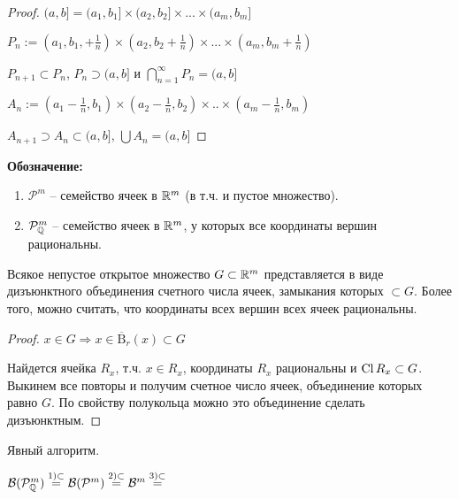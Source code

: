 \begin{proof}
    $(a, b] = (a_1, b_1] \times (a_2, b_2] \times ... \times (a_m, b_m]$

    $P_n:=(a_1, b_1, +\frac{1}{n})\times (a_2, b_2 +\frac{1}{n})\times ...\times (a_m, b_m +\frac{1}{n})$

    $P_{n+1}\subset P_n$, $P_n\supset (a, b]$ и $\bigcap\limits_{n=1}^\infty P_n=(a, b]$

    $A_n := (a_1 - \frac{1}{n}, b_1) \times (a_2 - \frac{1}{n}, b_2) \times .. \times (a_m - \frac{1}{n}, b_m)$

    $A_{n+1} \supset A_n \subset (a, b]$, $\bigcup A_n = (a, b]$
\end{proof}

\textbf{Обозначение:} 
\begin{enumerate}
    \item $\mathcal{P}^m$ – семейство ячеек в $\mathbb{R}^m$ (в т.ч. и пустое множество).
    \item $\mathcal{P}_{\mathbb{Q}}^m$ – семейство ячеек в $\mathbb{R}^m$, у которых все координаты вершин рациональны.
\end{enumerate}

\begin{theorem}
    Всякое непустое открытое множество $G \subset \mathbb{R}^m$ представляется в виде дизъюнктного объединения
    счетного числа ячеек, замыкания которых $\subset G$. Более того, можно считать, что координаты всех 
    вершин всех ячеек рациональны.
\end{theorem}

\begin{proof}
    $x\in G\Rightarrow x\in \overline{\text{B}}_{r}(x)\subset G$

    Найдется ячейка $R_x$, т.ч. $x\in R_x$, координаты $R_x$ рациональны и $\operatorname{Cl} R_x \subset G$. 
    Выкинем все повторы и получим счетное число ячеек, объединение которых равно $G$. По свойству 
    полукольца можно это объединение сделать дизъюнктным.
\end{proof}

\begin{remark}
    Явный алгоритм.
\end{remark}

\begin{corollary}
    $\mathcal{B}(\mathcal{P}_{\mathbb{Q}}^m)\overset{1) \subset}{=} \mathcal{B}(\mathcal{P}^m)\overset{2) \subset}{=}\mathcal{B}^m \overset{3) \subset}{=}$
\end{corollary}

